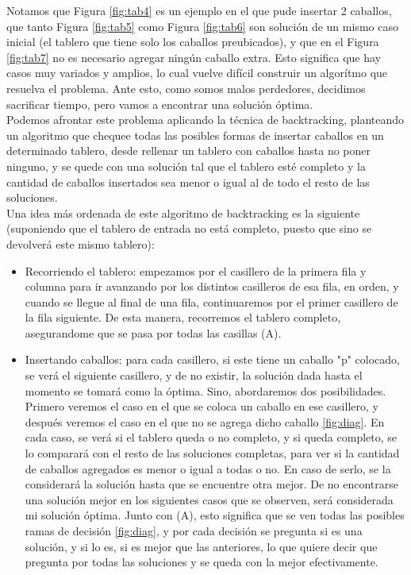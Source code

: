 Notamos que Figura \ref{fig:tab4} es un ejemplo en el que pude insertar 2 caballos, que tanto Figura \ref{fig:tab5} como Figura \ref{fig:tab6} son solución de un mismo caso inicial (el tablero que tiene solo los caballos preubicados), y que en el Figura \ref{fig:tab7} no es necesario agregar ningún caballo extra. Esto significa que hay casos muy variados y amplios, lo cual vuelve difícil construir un algorítmo que resuelva el problema. Ante esto, como somos malos perdedores, decidimos sacrificar tiempo, pero vamos a encontrar una solución óptima.\\
Podemos afrontar este problema aplicando la técnica de backtracking, planteando un algoritmo que chequee todas las posibles formas de insertar caballos en un determinado tablero, desde rellenar un tablero con caballos hasta no poner ninguno, y se quede con una solución tal que el tablero esté completo y la cantidad de caballos insertados sea menor o igual al de todo el resto de las soluciones.\\
Una idea más ordenada de este algoritmo de backtracking es la siguiente (suponiendo que el tablero de entrada no está completo, puesto que sino se devolverá este mismo tablero):
\begin{itemize}
\item Recorriendo el tablero: empezamos por el casillero de la primera fila y columna para ir avanzando por los distintos casilleros de esa fila, en orden, y cuando se llegue al final de una fila, continuaremos por el primer casillero de la fila siguiente. De esta manera, recorremos el tablero completo, asegurandome que se pasa por todas las casillas (A).
\item Insertando caballos: para cada casillero, si este tiene un caballo "p" colocado, se verá el siguiente casillero, y de no existir, la solución dada hasta el momento se tomará como la óptima. Sino, abordaremos dos posibilidades. Primero veremos el caso en el que se coloca un caballo en ese casillero, y después veremos el caso en el que no se agrega dicho caballo \ref{fig:diag}. En cada caso, se verá si el tablero queda o no completo, y si queda completo, se lo comparará con el resto de las soluciones completas, para ver si la cantidad de caballos agregados es menor o igual a todas o no. En caso de serlo, se la considerará la solución hasta que se encuentre otra mejor. De no encontrarse una solución mejor en los siguientes casos que se observen, será considerada mi solución óptima. Junto con (A), esto significa que se ven todas las posibles ramas de decisión \ref{fig:diag}, y por cada decisión se pregunta si es una solución, y si lo es, si es mejor que las anteriores, lo que quiere decir que pregunta por todas las soluciones y se queda con la mejor efectivamente.
\end{itemize}
